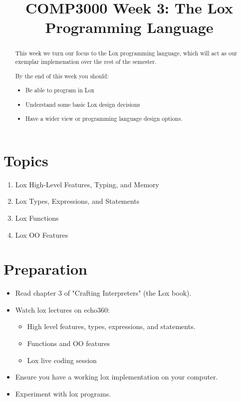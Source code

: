 \documentclass[twoside=false, DIV=14]{scrartcl}
\title{\color{redish} \vspace{-1em}COMP3000 Week 3: The Lox Programming Language}
\begin{document}
{\color{blackish}\maketitle}\vspace{-7em}

\begin{abstract}
This week we turn our focus to the Lox programming language, which will act as our exemplar implemenation over the rest of the semester.  

By the end of this week you should:
\begin{itemize}
    \item Be able to program in Lox
    \item Understand some basic Lox design decisions
    \item Have a wider view or programming language design options.
\end{itemize}
\end{abstract}

\section*{Topics}
\begin{enumerate}
\item Lox High-Level Features, Typing, and Memory
\item Lox Types, Expressions, and Statements
\item Lox Functions
\item Lox OO Features
\end{enumerate}

\section*{Preparation}
\begin{itemize}
\item Read chapter 3 of "Crafting Interpreters" (the Lox book).
\item Watch lox lectures on echo360:
  \begin{itemize}
  \item High level features, types, expressions, and statements.
  \item Functions and OO features
  \item Lox live coding session
  \end{itemize}
\item Ensure you have a working lox implementation on your computer.
\item Experiment with lox programs.
\end{itemize}
\end{document}
